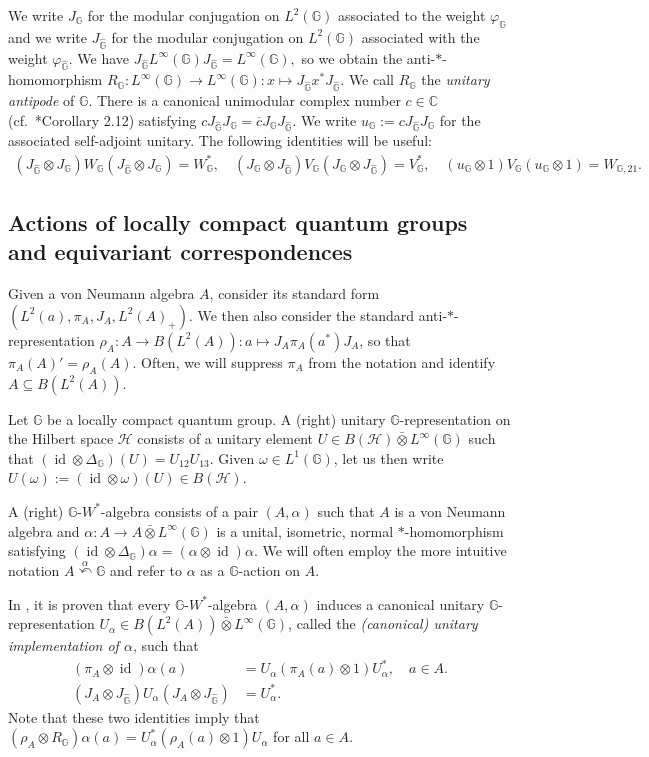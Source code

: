 \documentclass[reqno]{amsart}
\numberwithin{equation}{section}
\DeclareMathOperator{\id}{\mathrm{id}}
\newcommand{\mcH}{\mathcal{H}}
\newcommand{\G}{\mathbb{G}}
\newcommand{\ovot}{\bar{\otimes}}
\begin{document}
We write $J_\G$ for the modular conjugation on $L^2(\G)$ associated to the weight $\varphi_\G$ and we write $J_{\hat{\G}}$ for the modular conjugation on $L^2(\G)$ associated with the weight $\varphi_{\hat{\G}}$. We have 
$J_{\hat{\G}}L^\infty(\G)J_{\hat{\G}}=L^\infty(\G),$
so we obtain the anti-$*$-homomorphism
$R_\G: L^\infty(\G)\to L^\infty(\G): x \mapsto J_{\hat{\G}}x^*J_{\hat{\G}}.$
We call $R_\G$ the \emph{unitary antipode} of $\G$. There is a canonical unimodular complex number $c\in \mathbb{C}$ (cf.\ \cite{KV03}*{Corollary 2.12}) satisfying 
$c J_{\hat{\G}}J_\G=\overline{c}J_\G J_{\hat{\G}}.$
We write $u_\G:= c J_{\hat{\G}} J_\G$ for the associated self-adjoint unitary. The following identities will be useful:
\begin{align*}
    (J_{\hat{\G}}\otimes J_\G)W_\G(J_{\hat{\G}}\otimes J_\G)=W_\G^*, \quad (J_\G\otimes J_{\hat{\G}})V_\G(J_\G\otimes J_{\hat{\G}})=V_\G^*, \quad (u_\G\otimes 1)V_\G(u_\G\otimes 1)=W_{\G,21}.
\end{align*} 

\subsection{Actions of locally compact quantum groups and equivariant correspondences}\label{equivariant correspondences}

Given a von Neumann algebra $A$, consider its standard form $(L^2(a), \pi_A, J_A, L^2(A)_+)$. We then also consider the standard anti-$*$-representation
$\rho_A: A\to B(L^2(A)): a \mapsto J_A\pi_A(a^*)J_A$, so that $\pi_A(A)'= \rho_A(A)$. Often, we will suppress $\pi_A$ from the notation and identify $A\subseteq B(L^2(A))$.

Let $\G$ be a locally compact quantum group. A (right) unitary $\G$-representation on the Hilbert space $\mcH$ consists of a unitary element $U\in B(\mcH)\ovot L^\infty(\G)$ such that $(\id \otimes \Delta_\G)(U) = U_{12}U_{13}$. Given $\omega \in L^1(\G)$, let us then write $U(\omega):= (\id \otimes \omega)(U)\in B(\mcH)$.

 A (right) $\G$-$W^*$-algebra consists of a pair $(A, \alpha)$ such that $A$ is a von Neumann algebra and $\alpha: A \to A\ovot L^\infty(\G)$ is a unital, isometric, normal $*$-homomorphism satisfying $(\id \otimes \Delta_\G)\alpha= (\alpha\otimes \id)\alpha$. We will often employ the more intuitive notation $A\stackrel{\alpha}\curvearrowleft \G$ and refer to $\alpha$ as a $\G$-action on $A$. 
 
In \cite{Vae01}, it is proven that every $\G$-$W^*$-algebra $(A,\alpha)$ induces a canonical unitary $\G$-representation $U_\alpha\in B(L^2(A))\ovot L^\infty(\G)$, called the \emph{(canonical) unitary implementation of $\alpha$}, such that
\begin{align}
    (\pi_A\otimes \id)\alpha(a)&= U_\alpha(\pi_A(a)\otimes 1)U_\alpha^*, \quad a\in A.\\
\label{unitaryflip}(J_A\otimes J_{\hat{\G}})U_\alpha(J_A\otimes J_{\hat{\G}})&= U_\alpha^*.
\end{align}
Note that these two identities imply that $(\rho_A\otimes R_\G)\alpha(a)= U_\alpha^*(\rho_A(a)\otimes  1)U_\alpha$ for all $a\in A$.
\end{document}
